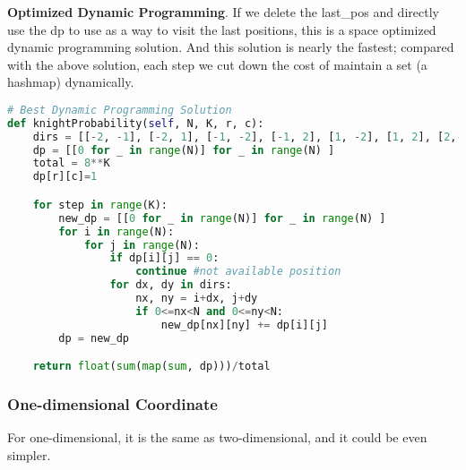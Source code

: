 \documentclass[../main.tex]{subfiles}
\begin{document}
\textbf{Optimized Dynamic Programming}. If we delete the last\_pos and directly use the dp to use as a way to visit the last positions, this is a space optimized dynamic programming solution. And this solution is nearly the fastest; compared with the above solution, each step we cut down the cost of maintain a set (a hashmap) dynamically. 
\begin{lstlisting}[language = Python]
# Best Dynamic Programming Solution
def knightProbability(self, N, K, r, c):
    dirs = [[-2, -1], [-2, 1], [-1, -2], [-1, 2], [1, -2], [1, 2], [2,-1],[2, 1]]
    dp = [[0 for _ in range(N)] for _ in range(N) ]
    total = 8**K
    dp[r][c]=1

    for step in range(K):
        new_dp = [[0 for _ in range(N)] for _ in range(N) ]
        for i in range(N):
            for j in range(N):
                if dp[i][j] == 0:
                    continue #not available position
                for dx, dy in dirs:
                    nx, ny = i+dx, j+dy
                    if 0<=nx<N and 0<=ny<N:
                        new_dp[nx][ny] += dp[i][j]
        dp = new_dp

    return float(sum(map(sum, dp)))/total
\end{lstlisting}

\subsubsection{One-dimensional Coordinate}
For one-dimensional, it is the same as two-dimensional, and it could be even simpler. 
\end{document}

